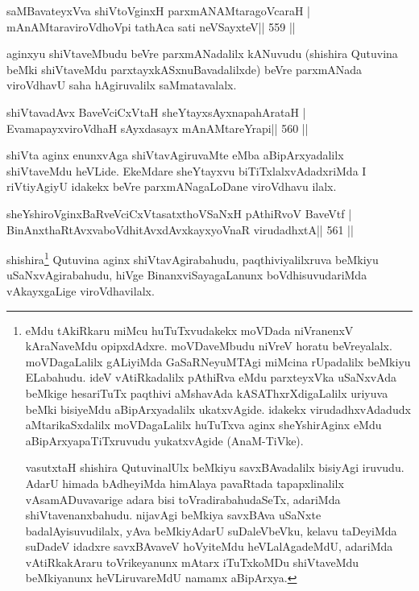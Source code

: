 \begin{shl}
saMBavateyxVva shiVtoV\s ginxH parxmANAMtaragoVcaraH |
mAnAMtaraviroVdhoV\s pi tathAca sati neVSayxteV\hfill || 559 ||
\end{shl}

\begin{artha}
aginxyu shiVtaveMbudu beVre parxmANadalilx kANuvudu (shishira Qutuvina beMki shiVtaveMdu parxtayxkASxnuBavadalilxde) beVre parxmANada viroVdhavU saha hAgiruvalilx saMmatavalalx.
\end{artha}

\begin{shl}
shiVtavadAvx BaveVciCxVtaH sheYtayxsAyxnapahArataH |
EvamapayxviroVdhaH sAyxdasayx mAnAMtareYrapi\hfill || 560 ||
\end{shl}

\begin{artha}
shiVta aginx enunxvAga shiVtavAgiruvaMte eMba aBipArxyadalilx shiVtaveMdu heVLide. EkeMdare sheYtayxvu biTiTxlalxvAdadxriMda I riVtiyAgiyU idakekx beVre parxmANagaLoDane viroVdhavu ilalx.
\end{artha}

\begin{shl}
sheYshiroV\s ginxBaRveVciCxVtasatxthoVSaNxH pAthiRvoV BaveVtf |
BinAnxthaRtAvxvaboVdhitAvxdAvxkayxyoVnaR virudadhxtA\hfill || 561 ||
\end{shl}
\newpage
\begin{artha}
shishira\footnote{eMdu tAkiRkaru miMcu huTuTxvudakekx moVDada niVranenxV
kAraNaveMdu opipxdAdxre. moVDaveMbudu niVreV horatu beVreyalalx.
moVDagaLalilx gALiyiMda GaSaRNeyuMTAgi miMcina rUpadalilx beMkiyu
ELabahudu. ideV vAtiRkadalilx pAthiRva eMdu parxteyxVka uSaNxvAda
beMkige hesariTuTx paqthivi aMshavAda kASAThxrXdigaLalilx uriyuva beMki
bisiyeMdu aBipArxyadalilx ukatxvAgide. idakekx virudadhxvAdadudx
aMtarikaSxdalilx moVDagaLalilx huTuTxva aginx sheYshirAginx eMdu
aBipArxyapaTiTxruvudu yukatxvAgide (AnaM-TiVke).

vasutxtaH shishira QutuvinalUlx beMkiyu savxBAvadalilx bisiyAgi
iruvudu. AdarU himada bAdheyiMda himAlaya pavaRtada tapapxlinalilx
vAsamADuvavarige adara bisi toVradirabahudaSeTx, adariMda
shiVtavenanxbahudu. nijavAgi beMkiya savxBAva uSaNxte
badalAyisuvudilalx, yAva beMkiyAdarU suDaleVbeVku, kelavu taDeyiMda
suDadeV idadxre savxBAvaveV hoVyiteMdu heVLalAgadeMdU, adariMda
vAtiRkakAraru toVrikeyanunx mAtarx iTuTxkoMDu shiVtaveMdu beMkiyanunx
heVLiruvareMdU namamx aBipArxya.} Qutuvina aginx shiVtavAgirabahudu, paqthiviyalilxruva beMkiyu
uSaNxvAgirabahudu, hiVge BinanxviSayagaLanunx boVdhisuvudariMda
vAkayxgaLige viroVdhavilalx.
\end{artha}

